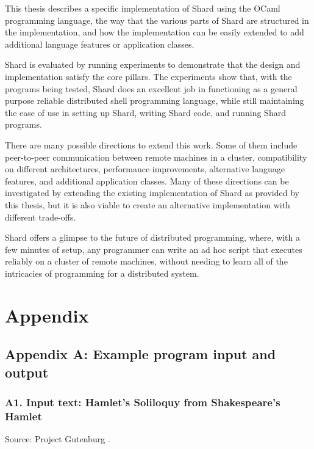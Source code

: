 \documentclass[twoside]{report}
\newcommand{\todoi}[1]{\todo[inline, color=blue!20]{TODO: {#1}}}
\begin{document}
This thesis describes a specific implementation of Shard using the OCaml programming language, the way that the various parts of Shard are structured in the implementation, and how the implementation can be easily extended to add additional language features or application classes.

Shard is evaluated by running experiments to demonstrate that the design and implementation satisfy the core pillars. The experiments show that, with the programs being tested, Shard does an excellent job in functioning as a general purpose reliable distributed shell programming language, while still maintaining the ease of use in setting up Shard, writing Shard code, and running Shard programs.

There are many possible directions to extend this work.
Some of them include peer-to-peer communication between remote machines in a cluster, compatibility on different architectures, performance improvements, alternative language features, and additional application classes.
Many of these directions can be investigated by extending the existing implementation of Shard as provided by this thesis, but it is also viable to create an alternative implementation with different trade-offs.


Shard offers a glimpse to the future of distributed programming, where, with a few minutes of setup, any programmer can write an ad hoc script that executes reliably on a cluster of remote machines, without needing to learn all of the intricacies of programming for a distributed system.


\chapter{Appendix}
\section{Appendix A: Example program input and output}

\subsection{A1. Input text: Hamlet's Soliloquy from Shakespeare's Hamlet}

Source: Project Gutenburg \cite{hamlet}.
\end{document}
